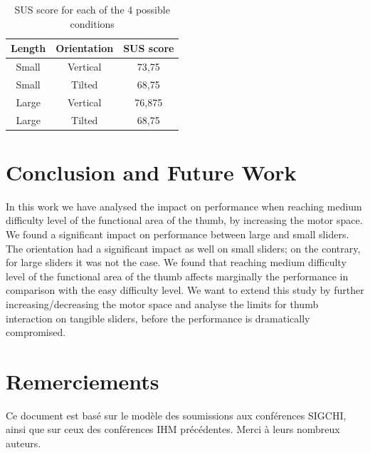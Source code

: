 \documentclass{sigchi}
\begin{document}
\begin{table}[h]
\centering
\caption{SUS score for each of the 4 possible conditions}
\label{my-label}
\begin{tabular}{|c|c|c|}
\hline
\textbf{Length} & \multicolumn{1}{l|}{\textbf{Orientation}} & \textbf{SUS score} \\ \hline
Small           & Vertical                                  & 73,75              \\ \hline
Small           & Tilted                                    & 68,75              \\ \hline
Large           & Vertical                                  & 76,875             \\ \hline
Large           & Tilted                                    & 68,75              \\ \hline
\end{tabular}
\end{table}

\section{Conclusion and Future Work}
In this work we have analysed the impact on performance when reaching medium difficulty level of the functional area of the thumb, by increasing the motor space. We found a significant impact on performance between large and small sliders. The orientation had a significant impact as well on small sliders; on the contrary, for large sliders it was not the case. We found that reaching medium difficulty level of the functional area of the thumb affects marginally the performance in comparison with the easy difficulty level. We want to extend this study by further increasing/decreasing the motor space and analyse the limits for thumb interaction on tangible sliders, before the performance is dramatically compromised.
\section{Remerciements}
Ce document est bas\'e sur le mod\`ele des soumissions aux conf\'erences SIGCHI, ainsi que sur ceux des conf\'erences IHM pr\'ec\'edentes. Merci \`a leurs nombreux auteurs.
\end{document}
